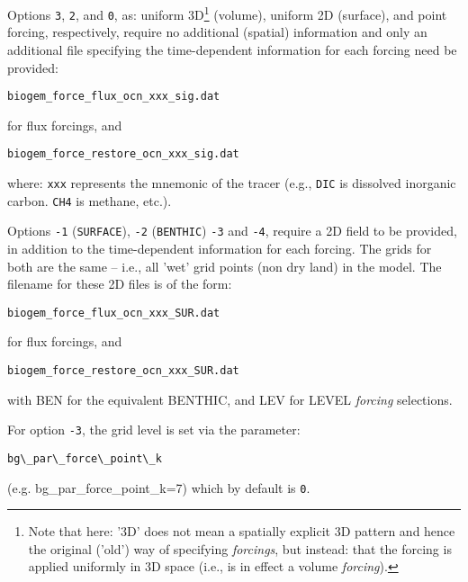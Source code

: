 \documentclass[11pt,fleqn]{book} %
\begin{document}
Options \texttt{3}, \texttt{2}, and \texttt{0}, as: uniform 3D\footnote{Note that here: '3D' does not mean a spatially explicit 3D pattern and hence the original ('old') way of specifying \textit{forcings}, but instead: that the forcing is applied uniformly in 3D space (i.e., is in effect a volume \textit{forcing}).} (volume), uniform 2D (surface), and point forcing, respectively, require no additional (spatial) information and only an additional file specifying the time-dependent information for each forcing need be provided:
\vspace{-2pt}\small\begin{verbatim}
biogem_force_flux_ocn_xxx_sig.dat
\end{verbatim}\normalsize\vspace{-2pt}
for flux forcings, and
\vspace{-2pt}\small\begin{verbatim}
biogem_force_restore_ocn_xxx_sig.dat
\end{verbatim}\normalsize\vspace{-2pt}
where: \texttt{xxx} represents the mnemonic of the tracer (e.g., \texttt{DIC} is dissolved inorganic carbon. \texttt{CH4} is methane, etc.).

Options \texttt{-1} (\texttt{SURFACE}), \texttt{-2} (\texttt{BENTHIC}) \texttt{-3} and  \texttt{-4}, require a 2D field to be provided, in addition to the time-dependent information for each forcing. The grids for both are the same -- i.e., all 'wet' grid points (non dry land) in the model. The filename for these 2D files is of the form:
\vspace{-2pt}\small\begin{verbatim}
biogem_force_flux_ocn_xxx_SUR.dat
\end{verbatim}\normalsize\vspace{-2pt}
for flux forcings, and
\vspace{-2pt}\small\begin{verbatim}
biogem_force_restore_ocn_xxx_SUR.dat
\end{verbatim}\normalsize\vspace{-2pt}
with \textsf{\footnotesize BEN} for the equivalent BENTHIC, and \textsf{\footnotesize LEV} for LEVEL \textit{forcing} selections.

For option \texttt{-3}, the grid level is set via the parameter:
\vspace{-2pt}\small\begin{verbatim}
bg\_par\_force\_point\_k
\end{verbatim}\normalsize\vspace{-2pt}
(e.g. bg\_par\_force\_point\_k=7) which by default is \texttt{0}.
\end{document}

